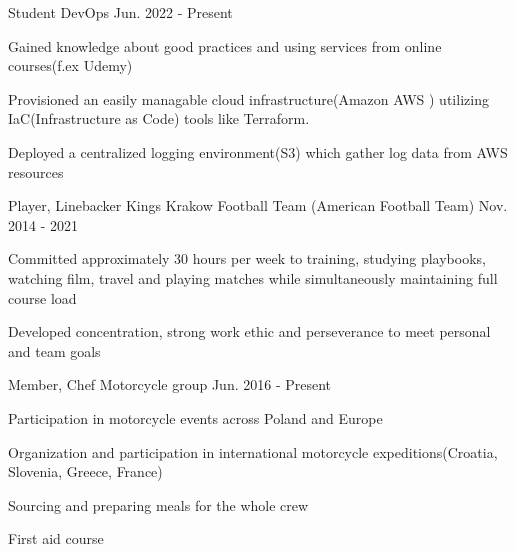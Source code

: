 

\begin{cventries}


  \cventry
    {Student} %
    {DevOps } %
    {} %
    {Jun. 2022 - Present} %
    {
      \begin{cvitems} %
       \item {Gained knowledge about good practices and using services from online courses(f.ex Udemy) }
        \item {Provisioned an easily managable cloud infrastructure(Amazon AWS ) utilizing IaC(Infrastructure as Code) tools like Terraform.}
        \item {Deployed a centralized logging environment(S3) which gather log data from AWS resources}
      \end{cvitems}
    }
    
  \cventry
    {Player, Linebacker} %
    {Kings Krakow Football Team (American Football Team)} %
    {} %
    {Nov. 2014 - 2021} %
    {
      \begin{cvitems} %
        \item {Committed approximately 30 hours per week to training, studying playbooks, watching film, travel and
 playing matches while simultaneously maintaining full course load}
        \item {Developed concentration, strong work ethic and perseverance to meet personal and team goals}
      \end{cvitems}
    }

  \cventry
    {Member, Chef} %
    {Motorcycle group} %
    {} %
    {Jun. 2016 - Present} %
    {
      \begin{cvitems} %
        \item {Participation in motorcycle events across Poland and Europe }
        \item {Organization and participation in international motorcycle expeditions(Croatia, Slovenia, Greece, France)}
        \item {Sourcing and preparing meals for the whole crew}
        \item {First aid course}
      \end{cvitems}
    }


\end{cventries}
